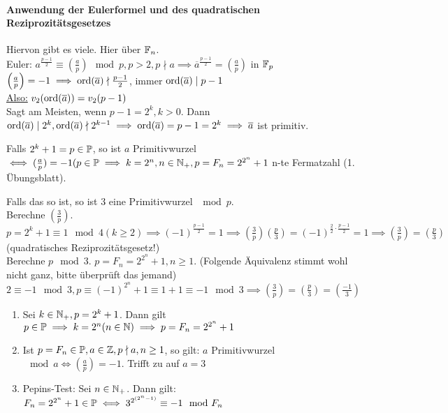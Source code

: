 \documentclass[a4paper,DIV15,BCOR12mm]{article}
\begin{document}
\paragraph{Anwendung der Eulerformel und des quadratischen
Reziprozitätsgesetzes}
Hiervon gibt es viele. Hier über $\mathbb{F}_n$.\\
Euler: $a^{\frac{p-1}{2}} \equiv \left(\frac{a}{p}\right) \mod p, p > 2, p \nmid a \implies \overline a^{\frac{p-1}{2}} = \left(\frac{a}{p}\right)$ in $\mathbb{F}_p$\\
$\left(\frac{a}{p}\right) = -1 \implies \mathop{\rm ord}\nolimits(\overline a) \nmid \frac{p-1}{2}$, immer $\mathop{\rm ord}\nolimits(\overline a) \mid p-1$\\
\underline{Also:} $v_2(\mathop{\rm ord}\nolimits(\overline a)) = v_2(p-1)$\\
Sagt am Meisten, wenn $p-1 = 2^k, k > 0$. Dann $\mathop{\rm ord}\nolimits(\overline a)
\mid 2^k, \mathop{\rm ord}\nolimits(\overline a) \nmid 2^{k-1} \implies \mathop{\rm ord}\nolimits(\overline a)
= p-1 = 2^k \implies \overline a$ ist primitiv.

Falls $2^k + 1 = p \in \mathbb{P}$, so ist $a$ Primitivwurzel $\iff
(\frac{a}{p}) = -1 (p \in \mathbb{P} \implies k = 2^n, n \in \mathbb{N}_+, p =
F_n = 2^{2^n}+1$ n-te Fermatzahl (1. Übungsblatt).

Falls das so ist, so ist $3$ eine Primitivwurzel $\mod p$.\\
Berechne $(\frac{3}{p})$. $p = 2^k + 1 \equiv 1 \mod 4 (k \ge 2) \implies (-1)^{\frac{p-1}{2}} = 1 \implies (\frac{3}{p})(\frac{p}{3}) = (-1)^{\frac{2}{2} \cdot \frac{p-1}{2}} = 1 \implies (\frac{3}{p}) = (\frac{p}{3})$ (quadratisches Reziprozitätsgesetz!)\\
Berechne $p \mod 3$. $p = F_n = 2^{2^n}+1, n \ge 1$. (Folgende
Äquivalenz stimmt wohl nicht ganz, bitte überprüft das jemand) $2
\equiv -1 \mod 3, p \equiv (-1)^{2^n} + 1 \equiv 1 + 1 \equiv -1
\mod 3 \implies \left(\frac{3}{p}\right) = \left(\frac{p}{3}\right)
= \left(\frac{-1}{3}\right)$

\begin{satz}
    \begin{enumerate}
        \item Sei $k \in \mathbb{N}_+, p = 2^k + 1$. Dann gilt $p \in \mathbb{P} \implies k = 2^n (n \in \mathbb{N}) \implies p = F_n = 2^{2^n} + 1$
        \item Ist $p = F_n \in \mathbb{P}, a \in \mathbb{Z}, p \nmid a, n \ge 1$, so gilt: $a$ Primitivwurzel $\mod a \iff (\frac{a}{p}) = -1$. Trifft zu auf $a = 3$
        \item Pepins-Test: Sei $n \in \mathbb{N}_+$. Dann gilt: $F_n = 2^{2^n} + 1 \in \mathbb{P} \iff 3^{2^{(2^n - 1)}} \equiv -1 \mod F_n$
    \end{enumerate}
\end{satz}
\end{document}
